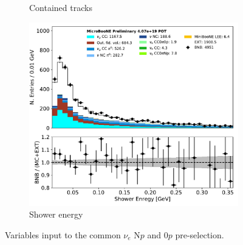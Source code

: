 \begin{figure}[H]
\begin{center}
\begin{subfigure}[b]{0.3\textwidth}
    \caption{\label{fig:nue:presel:ntrack} Contained tracks}
    \end{subfigure}
    \begin{subfigure}[b]{0.3\textwidth}
    \centering
    \includegraphics[width=1.00\textwidth]{nueselection/shr_energy_tot_cali_01132020_RUN1.pdf}
    \caption{\label{fig:nue:presel:shrenergy} Shower energy}
    \end{subfigure}
\caption{\label{fig:nue:presel}Variables input to the common $\nu_e$ N$p$ and 0$p$ pre-selection.}
\end{center}
\end{figure}

